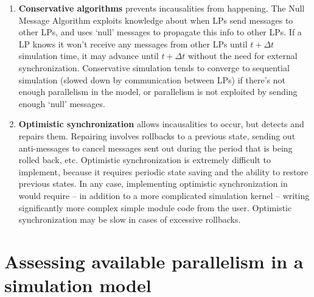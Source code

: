 \begin{enumerate}
  \item{\textbf{Conservative algorithms}
    prevents incausalities from happening. The Null Message Algorithm
    exploits knowledge about when LPs send messages to other LPs,
    and uses `null' messages to propagate this info to other LPs.
    If a LP knows it won't receive any messages from other
    LPs until $t+\Delta t$ simulation time, it may advance until
    $t+\Delta t$ without the need for external synchronization.
    Conservative simulation tends to converge to sequential simulation
    (slowed down by communication between LPs) if there's not
    enough parallelism in the model, or parallelism is not exploited
    by sending enough `null' messages.}

  \item{\textbf{Optimistic synchronization}
    allows incausalities to occur, but detects and
    repairs them. Repairing involves rollbacks to a previous state,
    sending out anti-messages to cancel messages sent out during the
    period that is being rolled back, etc.  Optimistic synchronization
    is extremely difficult to implement, because it requires periodic
    state saving and the ability to restore previous states. In any
    case, implementing optimistic synchronization in {\opp} would
    require -- in addition to a more complicated simulation kernel --
    writing significantly more complex simple
    module code from the user.  Optimistic synchronization may be slow
    in cases of excessive rollbacks.}
\end{enumerate}


\section{Assessing available parallelism in a simulation model}


